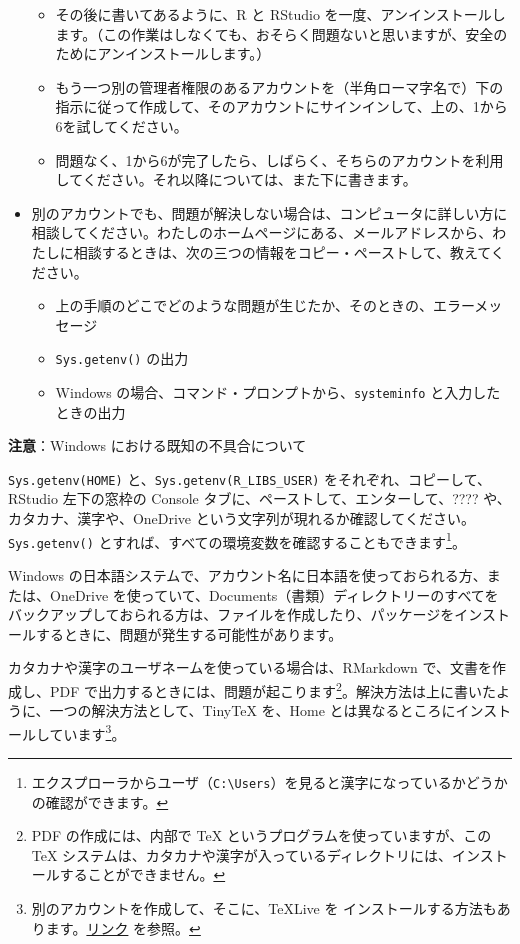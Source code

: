 \documentclass[
  xelatex, ja=standard]{bxjsbook}
\providecommand{\tightlist}{%
  \setlength{\itemsep}{0pt}\setlength{\parskip}{0pt}}
\theoremstyle{definition}
\theoremstyle{definition}
\theoremstyle{definition}
\theoremstyle{definition}
\theoremstyle{remark}
\begin{document}
\begin{itemize}
  \begin{itemize}
  \tightlist
  \item
    その後に書いてあるように、R と RStudio を一度、アンインストールします。（この作業はしなくても、おそらく問題ないと思いますが、安全のためにアンインストールします。）
  \item
    もう一つ別の管理者権限のあるアカウントを（半角ローマ字名で）下の指示に従って作成して、そのアカウントにサインインして、上の、1から6を試してください。
  \item
    問題なく、1から6が完了したら、しばらく、そちらのアカウントを利用してください。それ以降については、また下に書きます。
  \end{itemize}
\item
  別のアカウントでも、問題が解決しない場合は、コンピュータに詳しい方に相談してください。わたしのホームページにある、メールアドレスから、わたしに相談するときは、次の三つの情報をコピー・ペーストして、教えてください。

  \begin{itemize}
  \tightlist
  \item
    上の手順のどこでどのような問題が生じたか、そのときの、エラーメッセージ
  \item
    \texttt{Sys.getenv()} の出力
  \item
    Windows の場合、コマンド・プロンプトから、\texttt{systeminfo} と入力したときの出力
  \end{itemize}
\end{itemize}

\textbf{注意}：Windows における既知の不具合について

\texttt{Sys.getenv(\textquotesingle{}HOME\textquotesingle{})} と、\texttt{Sys.getenv(\textquotesingle{}R\_LIBS\_USER\textquotesingle{})} をそれぞれ、コピーして、RStudio 左下の窓枠の Console タブに、ペーストして、エンターして、???? や、カタカナ、漢字や、OneDrive という文字列が現れるか確認してください。\texttt{Sys.getenv()} とすれば、すべての環境変数を確認することもできます\footnote{エクスプローラからユーザ（\texttt{C:\textbackslash{}Users}）を見ると漢字になっているかどうかの確認ができます。}。

Windows の日本語システムで、アカウント名に日本語を使っておられる方、または、OneDrive を使っていて、Documents（書類）ディレクトリーのすべてをバックアップしておられる方は、ファイルを作成したり、パッケージをインストールするときに、問題が発生する可能性があります。

カタカナや漢字のユーザネームを使っている場合は、RMarkdown で、文書を作成し、PDF で出力するときには、問題が起こります\footnote{PDF の作成には、内部で TeX というプログラムを使っていますが、この TeX システムは、カタカナや漢字が入っているディレクトリには、インストールすることができません。}。解決方法は上に書いたように、一つの解決方法として、TinyTeX を、Home とは異なるところにインストールしています\footnote{別のアカウントを作成して、そこに、TeXLive を インストールする方法もあります。\href{https://icu-hsuzuki.github.io/myds/techmemo.html\#windows-installation-of-r-rstudio-tex}{リンク} を参照。}。
\end{document}
